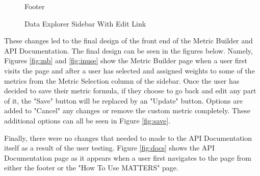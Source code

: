 			\begin{figure}[t]
				\centering
					\caption{Footer}
					\label{fig:footer}
			\end{figure}
			
			\begin{figure}[t]
				\centering
					\caption{Data Explorer Sidebar With Edit Link}
					\label{fig:edit}
			\end{figure}
			
		These changes led to the final design of the front end of the Metric Builder 
		and API Documentation. The final design can be seen in the figures below. Namely, Figures \ref{fig:mb} and \ref{fig:inuse} show the Metric Builder page when a user first visits 
		the page and after a user has selected and assigned weights to some of the metrics from the Metric Selection column of the sidebar. Once the user has decided to save their metric formula, 
		if they choose to go back and edit any part of it, the "Save" button will be replaced by an "Update" button. Options are added to "Cancel" any changes or remove the custom metric completely. 
		These additional options can all be seen in Figure \ref{fig:save}. 
		
		Finally, there were no changes that needed to made to the API Documentation itself as a result of the user testing. 
		Figure \ref{fig:docs} shows the API Documentation page as it appears when a user first navigates to the page from either the footer or the "How To Use MATTERS" page.

